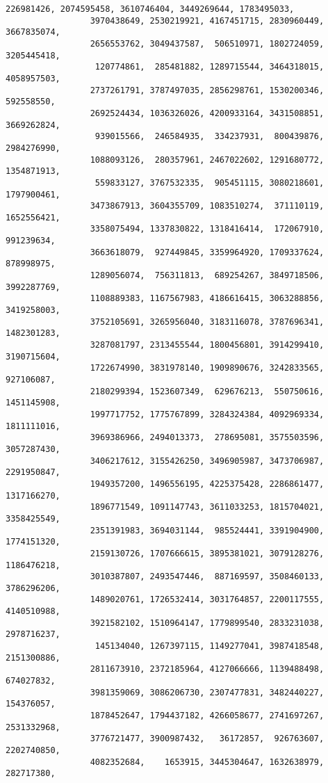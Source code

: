 \documentclass[11pt]{article}
\begin{document}
\begin{Verbatim}[commandchars=\\\{\}]
                  226981426, 2074595458, 3610746404, 3449269644, 1783495033,
                 3970438649, 2530219921, 4167451715, 2830960449, 3667835074,
                 2656553762, 3049437587,  506510971, 1802724059, 3205445418,
                  120774861,  285481882, 1289715544, 3464318015, 4058957503,
                 2737261791, 3787497035, 2856298761, 1530200346,  592558550,
                 2692524434, 1036326026, 4200933164, 3431508851, 3669262824,
                  939015566,  246584935,  334237931,  800439876, 2984276990,
                 1088093126,  280357961, 2467022602, 1291680772, 1354871913,
                  559833127, 3767532335,  905451115, 3080218601, 1797900461,
                 3473867913, 3604355709, 1083510274,  371110119, 1652556421,
                 3358075494, 1337830822, 1318416414,  172067910,  991239634,
                 3663618079,  927449845, 3359964920, 1709337624,  878998975,
                 1289056074,  756311813,  689254267, 3849718506, 3992287769,
                 1108889383, 1167567983, 4186616415, 3063288856, 3419258003,
                 3752105691, 3265956040, 3183116078, 3787696341, 1482301283,
                 3287081797, 2313455544, 1800456801, 3914299410, 3190715604,
                 1722674990, 3831978140, 1909890676, 3242833565,  927106087,
                 2180299394, 1523607349,  629676213,  550750616, 1451145908,
                 1997717752, 1775767899, 3284324384, 4092969334, 1811111016,
                 3969386966, 2494013373,  278695081, 3575503596, 3057287430,
                 3406217612, 3155426250, 3496905987, 3473706987, 2291950847,
                 1949357200, 1496556195, 4225375428, 2286861477, 1317166270,
                 1896771549, 1091147743, 3611033253, 1815704021, 3358425549,
                 2351391983, 3694031144,  985524441, 3391904900, 1774151320,
                 2159130726, 1707666615, 3895381021, 3079128276, 1186476218,
                 3010387807, 2493547446,  887169597, 3508460133, 3786296206,
                 1489020761, 1726532414, 3031764857, 2200117555, 4140510988,
                 3921582102, 1510964147, 1779899540, 2833231038, 2978716237,
                  145134040, 1267397115, 1149277041, 3987418548, 2151300886,
                 2811673910, 2372185964, 4127066666, 1139488498,  674027832,
                 3981359069, 3086206730, 2307477831, 3482440227,  154376057,
                 1878452647, 1794437182, 4266058677, 2741697267, 2531332968,
                 3776721477, 3900987432,   36172857,  926763607, 2202740850,
                 4082352684,    1653915, 3445304647, 1632638979,  282717380,

\end{Verbatim}
\end{document}
